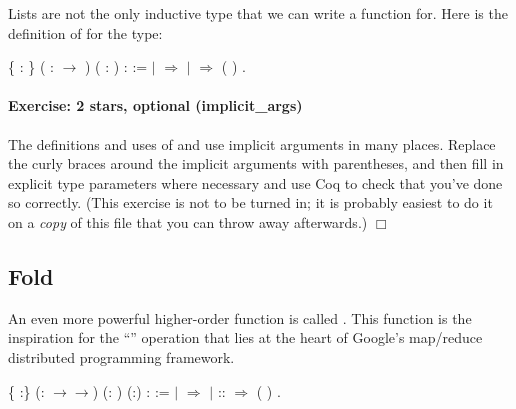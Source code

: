 \documentclass[12pt]{report}
\begin{document}
 Lists are not the only inductive type that we can write a
     function for.  Here is the definition of  for the
     type: \begin{coqdoccode}
\coqdocemptyline
\coqdocnoindent
{}  \{  : \} ( :  \ensuremath{\rightarrow} ) ( :  )\coqdoceol
\coqdocindent{11.00em}
:   :=\coqdoceol
\coqdocindent{1.00em}
  \coqdoceol
\coqdocindent{2.00em}
\ensuremath{|}  \ensuremath{\Rightarrow} \coqdoceol
\coqdocindent{2.00em}
\ensuremath{|}   \ensuremath{\Rightarrow}  ( )\coqdoceol
\coqdocindent{1.00em}
.\coqdoceol
\coqdocemptyline
\end{coqdoccode}
\paragraph{Exercise: 2 stars, optional (implicit\_args)}

 The definitions and uses of  and  use implicit
    arguments in many places.  Replace the curly braces around the
    implicit arguments with parentheses, and then fill in explicit
    type parameters where necessary and use Coq to check that you've
    done so correctly.  (This exercise is not to be turned in; it is
    probably easiest to do it on a \textit{copy} of this file that you can
    throw away afterwards.)  \ensuremath{\Box} \begin{coqdoccode}
\coqdocemptyline
\end{coqdoccode}
\subsection{Fold}



 An even more powerful higher-order function is called
    .  This function is the inspiration for the ``''
    operation that lies at the heart of Google's map/reduce
    distributed programming framework. \begin{coqdoccode}
\coqdocemptyline
\coqdocnoindent
{}  \{ :\} (: \ensuremath{\rightarrow}\ensuremath{\rightarrow}) (: ) (:) :  :=\coqdoceol
\coqdocindent{1.00em}
  \coqdoceol
\coqdocindent{1.00em}
\ensuremath{|}  \ensuremath{\Rightarrow} \coqdoceol
\coqdocindent{1.00em}
\ensuremath{|}  ::  \ensuremath{\Rightarrow}   (   )\coqdoceol
\coqdocindent{1.00em}
.\coqdoceol
\coqdocemptyline
\end{coqdoccode}
\end{document}
